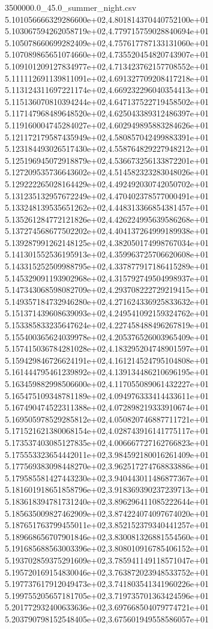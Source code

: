 \begin{filecontents*}{3500000.0_45.0_summer_night.csv}
5.101056666329286600e+02,4.801814370440752100e+01
5.103067594262058719e+02,4.779715759028840694e+01
5.105078660699282409e+02,4.757617787133131060e+01
5.107089865651074660e+02,4.735520454820743907e+01
5.109101209127834977e+02,4.713423762157708552e+01
5.111112691139811091e+02,4.691327709208417218e+01
5.113124311697221174e+02,4.669232296040354413e+01
5.115136070810394244e+02,4.647137522719458502e+01
5.117147968489648520e+02,4.625043389312486397e+01
5.119160004745284027e+02,4.602949895883284626e+01
5.121172179587435949e+02,4.580857042499883391e+01
5.123184493026517430e+02,4.558764829227948212e+01
5.125196945072918879e+02,4.536673256133872201e+01
5.127209535736643602e+02,4.514582323283048026e+01
5.129222265028164429e+02,4.492492030742050702e+01
5.131235132957672249e+02,4.470402378577000491e+01
5.133248139535651262e+02,4.448313366854381457e+01
5.135261284772121826e+02,4.426224995639586268e+01
5.137274568677502202e+02,4.404137264999189938e+01
5.139287991262148125e+02,4.382050174998767034e+01
5.141301552536195913e+02,4.359963725706620608e+01
5.143315252509988795e+02,4.337877917186415289e+01
5.145329091193902968e+02,4.315792749504998937e+01
5.147343068598082709e+02,4.293708222729219415e+01
5.149357184732946280e+02,4.271624336925833632e+01
5.151371439608639093e+02,4.249541092159324762e+01
5.153385833235647624e+02,4.227458488496267819e+01
5.155400365624039978e+02,4.205376526003965409e+01
5.157415036784281028e+02,4.183295204748901597e+01
5.159429846726624191e+02,4.161214524795104808e+01
5.161444795461239892e+02,4.139134486210696195e+01
5.163459882998506600e+02,4.117055089061432227e+01
5.165475109348781189e+02,4.094976333414433611e+01
5.167490474522311388e+02,4.072898219333910674e+01
5.169505978529285812e+02,4.050820746887711721e+01
5.171521621380068154e+02,4.028743916141775117e+01
5.173537403085127835e+02,4.006667727162766823e+01
5.175553323654442011e+02,3.984592180016261409e+01
5.177569383098448270e+02,3.962517274768833886e+01
5.179585581427443230e+02,3.940443011486877367e+01
5.181601918651858796e+02,3.918369390237239713e+01
5.183618394781731240e+02,3.896296411085222644e+01
5.185635009827462909e+02,3.874224074097674020e+01
5.187651763799455011e+02,3.852152379340441257e+01
5.189668656707901846e+02,3.830081326881554560e+01
5.191685688563003396e+02,3.808010916785406152e+01
5.193702859375291609e+02,3.785941149118571047e+01
5.195720169154830046e+02,3.763872023948533752e+01
5.197737617912049473e+02,3.741803541341960226e+01
5.199755205657181705e+02,3.719735701363424596e+01
5.201772932400633636e+02,3.697668504079774721e+01
5.203790798152548405e+02,3.675601949558586057e+01

\end{filecontents*}
